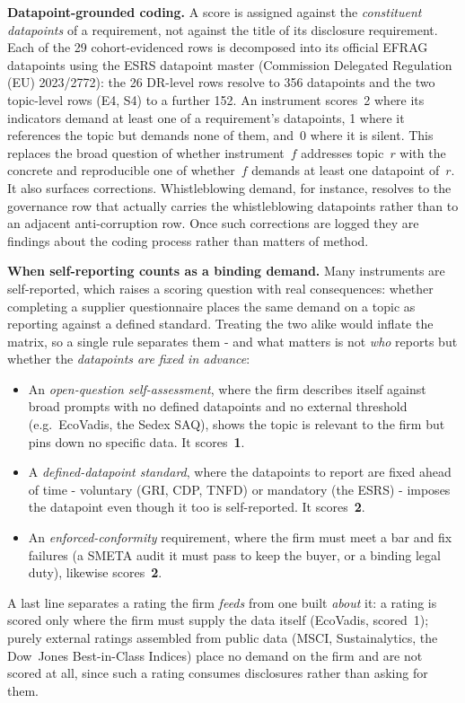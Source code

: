 \textbf{Datapoint-grounded coding.} A score is assigned against the
\emph{constituent datapoints} of a requirement, not against the title of its
disclosure requirement. Each of the 29 cohort-evidenced rows is decomposed into
its official EFRAG datapoints using the ESRS datapoint master (Commission
Delegated Regulation (EU) 2023/2772): the 26 DR-level rows resolve to 356
datapoints and the two topic-level rows (E4, S4) to a further 152. An instrument
scores~2 where its indicators demand at least one of a requirement's datapoints,
1 where it references the topic but demands none of them, and~0 where it is
silent. This replaces the broad question of whether instrument~$f$ addresses
topic~$r$ with the concrete and reproducible one of whether~$f$ demands at least
one datapoint of~$r$. It also surfaces corrections. Whistleblowing demand, for
instance, resolves to the governance row that actually carries the whistleblowing
datapoints rather than to an adjacent anti-corruption row. Once such corrections
are logged they are findings about the coding process rather than matters of
method.

\textbf{When self-reporting counts as a binding demand.} Many instruments are
self-reported, which raises a scoring question with real consequences: whether
completing a supplier questionnaire places the same demand on a topic as reporting
against a defined standard. Treating the two alike would inflate the matrix, so a
single rule separates them - and what matters is not \emph{who} reports but whether
the \emph{datapoints are fixed in advance}:
\begin{itemize}
\item An \emph{open-question self-assessment}, where the firm describes itself
against broad prompts with no defined datapoints and no external threshold
(e.g.\ EcoVadis, the Sedex SAQ), shows the topic is relevant to the firm but
pins down no specific data. It scores~\textbf{1}.
\item A \emph{defined-datapoint standard}, where the datapoints to report are fixed
ahead of time - voluntary (GRI, CDP, TNFD) or mandatory (the ESRS) - imposes the
datapoint even though it too is self-reported. It scores~\textbf{2}.
\item An \emph{enforced-conformity} requirement, where the firm must meet a bar and
fix failures (a SMETA audit it must pass to keep the buyer, or a binding legal duty),
likewise scores~\textbf{2}.
\end{itemize}
A last line separates a rating the firm \emph{feeds} from one built \emph{about} it:
a rating is scored only where the firm must supply the data itself (EcoVadis,
scored~1); purely external ratings assembled from public data (MSCI, Sustainalytics,
the Dow~Jones Best-in-Class Indices) place no demand on the firm and are not scored
at all, since such a rating consumes disclosures rather than asking for them.

